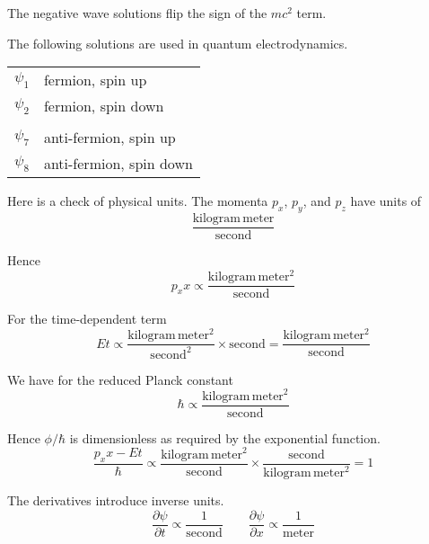 \documentclass[12pt]{article}
\begin{document}
\noindent
The negative wave solutions flip the sign of the $mc^2$ term.

\bigskip
\noindent
The following solutions are used in quantum electrodynamics.
\begin{center}
\begin{tabular}{ll}
$\psi_1$ & fermion, spin up\\
$\psi_2$ & fermion, spin down\\
\\
$\psi_7$ & anti-fermion, spin up\\
$\psi_8$ & anti-fermion, spin down
\end{tabular}
\end{center}

\noindent
Here is a check of physical units.
The momenta $p_x$, $p_y$, and $p_z$ have units of
\begin{equation*}
\frac{\text{kilogram}\,\text{meter}}{\text{second}}
\end{equation*}

\noindent
Hence
\begin{equation*}
p_xx\propto\frac{\text{kilogram}\,\text{meter}^2}{\text{second}}
\end{equation*}

\noindent
For the time-dependent term
\begin{equation*}
Et\propto\frac{\text{kilogram}\,\text{meter}^2}{\text{second}^2}\times\text{second}
=\frac{\text{kilogram}\,\text{meter}^2}{\text{second}}
\end{equation*}

\noindent
We have for the reduced Planck constant
\begin{equation*}
\hbar\propto\frac{\text{kilogram}\,\text{meter}^2}{\text{second}}
\end{equation*}

\noindent
Hence $\phi/\hbar$ is dimensionless as required by the exponential function.
\begin{equation*}
\frac{p_xx-Et}{\hbar}\propto\frac{\text{kilogram}\,\text{meter}^2}{\text{second}}
\times\frac{\text{second}}{\text{kilogram}\,\text{meter}^2}=1
\end{equation*}

\noindent
The derivatives introduce inverse units.
\begin{equation*}
\frac{\partial\psi}{\partial t}\propto\frac{1}{\text{second}}
\qquad
\frac{\partial\psi}{\partial x}\propto\frac{1}{\text{meter}}
\end{equation*}
\end{document}
